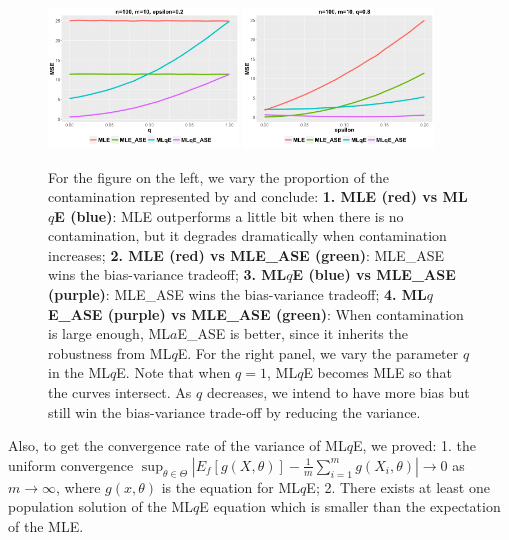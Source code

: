 \documentclass[simplex.tex]{subfiles}
\begin{document}
\begin{figure}[h!] 
\begin{cframed} 
\centering
\includegraphics[width=0.45\textwidth]{./figs/robQ.png}
\hspace{6pt}
\includegraphics[width=0.45\textwidth]{./figs/robEps.png} 
\caption{
For the figure on the left, we vary the proportion of the contamination
represented by  and conclude: \textbf{1. MLE (red) vs ML$q$E 
(blue)}: MLE outperforms a little bit when there is no
contamination, but it degrades dramatically when contamination
increases; \textbf{2. MLE (red) vs MLE\_ASE (green)}: MLE\_ASE wins
the bias-variance tradeoff; 
\textbf{3. ML$q$E  (blue) vs MLE\_ASE (purple)}: 
MLE\_ASE wins the bias-variance tradeoff; 
\textbf{4.  ML$q$E\_ASE (purple) vs MLE\_ASE (green)}: 
When contamination is large enough, ML$a$E\_ASE is better, since it 
inherits the robustness from ML$q$E.  For the right panel, we vary 
the parameter $q$ in the ML$q$E.  Note that when $q=1$, ML$q$E becomes 
MLE so that the curves intersect. As $q$ decreases, we intend to have 
more bias but still win the bias-variance trade-off by reducing the variance.
}
\label{fig:rlolg} 
\end{cframed}
\end{figure}



Also, to get the convergence rate of the variance of ML$q$E, we
proved: 1. the uniform convergence $\sup_{\theta \in \Theta} \left|
E_f[g(X, \theta)] − \frac{1}{m} \sum_{i=1}^m g(X_i, \theta) \right| \to
0$ as $m \to \infty$, where $g(x, \theta)$ is the equation for
ML$q$E; 2. There exists at least one population solution of the
ML$q$E equation which is smaller than the expectation of the MLE.
\end{document}
